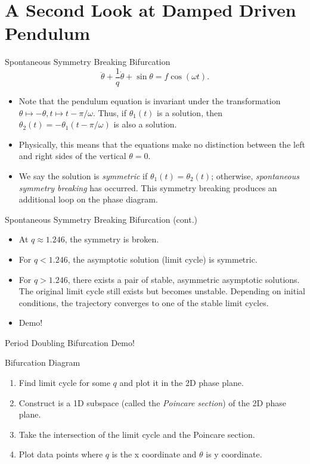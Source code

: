 \documentclass[aspectratio=169]{beamer}
\begin{document}
\section{A Second Look at Damped Driven Pendulum}
\frame{\sectionpage}

\begin{frame}{Spontaneous Symmetry Breaking Bifurcation}
$$\ddot{\theta} + \frac{1}{q} \dot{\theta} + \sin\theta = f \cos(\omega t).$$
\begin{itemize}
    \item Note that the pendulum equation is invariant under the transformation $\theta \mapsto -\theta, t \mapsto t-\pi/\omega$. Thus, if $\theta_1(t)$ is a solution, then $\theta_2(t) = -\theta_1(t-\pi/\omega)$ is also a solution. 
    \item Physically, this means that the equations make no distinction between the left and right sides of the vertical $\theta = 0$. 
    \item We say the solution is \textit{symmetric} if $\theta_1(t) = \theta_2(t)$; otherwise, \textit{spontaneous symmetry breaking} has occurred. This symmetry breaking produces an additional loop on the phase diagram. \\
\end{itemize}
\end{frame}

\begin{frame}{Spontaneous Symmetry Breaking Bifurcation (cont.)}
\begin{itemize}
    \item At $q \approx 1.246$, the symmetry is broken. 
    \item For $q < 1.246$, the asymptotic solution (limit cycle) is symmetric. 
    \item For $q > 1.246$, there exists a pair of stable, asymmetric asymptotic solutions. The original limit cycle still exists but becomes unstable. Depending on initial conditions, the trajectory converges to one of the stable limit cycles. 
    \item Demo!
\end{itemize}
\end{frame}

\begin{frame}{Period Doubling Bifurcation}
    Demo!
\end{frame}

\begin{frame}{Bifurcation Diagram}
\begin{enumerate}
    \item Find limit cycle for some $q$ and plot it in the 2D phase plane.
    \item Construct is a 1D subspace (called the \textit{Poincare section}) of the 2D phase plane.
    \item Take the intersection of the limit cycle and the Poincare section.
    \item Plot data points where $q$ is the x coordinate and $\theta$ is y coordinate.  
\end{enumerate}
\end{frame}
\end{document}
